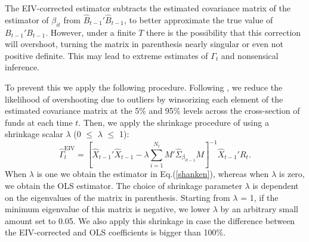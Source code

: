 \par The EIV-corrected estimator subtracts the estimated covariance matrix of the estimator of $\beta_{it}$ from $\hat{B}_{t-1}'\hat{B}_{t-1}$, to better approximate the true value of $B_{t-1}'B_{t-1}$. However, under a finite $T$ there is the possibility that this correction will overshoot, turning the matrix in parenthesis  nearly singular or even not positive definite. This may lead to extreme estimates of $\Gamma_t$ and nonsensical inference. 
\par To prevent this we apply the following procedure. Following \citet{chordia2015cross}, we reduce the likelihood of overshooting due to outliers by winsorizing each element of the estimated covariance matrix at the 5\% and 95\% levels across the cross-section of funds at each time $t$. Then, we apply the shrinkage procedure of \citet{raponi2017testing} using a shrinkage scalar $\lambda$ (0 $\leq$ $\lambda$ $\leq$ 1):
\begin{equation}
    \label{Y_EIV} 
    \hat{\Gamma}^{\text{EIV}}_{t} = \left[\hat{X}_{t-1}'\hat{X}_{t-1} - \lambda\sum^{N_t}_{i=1}M'\hat{\Sigma}_{\beta_{it-1}}M\right]^{-1}\hat{X}_{t-1}'R_{t}.
\end{equation}
When $\lambda$ is one we obtain the estimator in Eq.(\ref{shanken}), whereas when $\lambda$ is zero, we obtain the OLS estimator. The choice of shrinkage parameter $\lambda$ is dependent on the eigenvalues of the matrix in parenthesis. Starting from $\lambda$ = 1, if the minimum eigenvalue of this matrix is negative, we lower $\lambda$ by an arbitrary small amount set to 0.05. We also apply this shrinkage in case the difference between the EIV-corrected and OLS coefficients is bigger than 100\%. 
